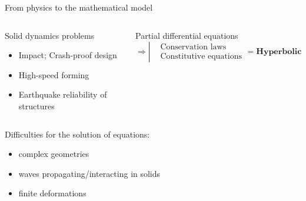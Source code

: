 \begin{frame}{From physics to the mathematical model}
\begin{overprint}
    \begin{columns}
      \begin{column}{0.45\textwidth}
        \begin{block}{Solid dynamics problems}
          \begin{itemize}
          \item[] Impact; Crash-proof design
          \item[] High-speed forming
          \item[] Earthquake reliability of structures 
          \end{itemize}
        \end{block}
      \end{column}
      
      \begin{column}{0.55\textwidth}
        \begin{block}{Partial differential equations}
          \begin{equation*}
            \Rightarrow \left\lvert
              \begin{aligned}
                & \text{Conservation laws} \\
                & \text{Constitutive equations} 
              \end{aligned}
            \right. = \textbf{Hyperbolic system}
          \end{equation*}
        \end{block}
      \end{column}
    \end{columns}
    
    \begin{block}{Difficulties for the solution of equations:}
      \begin{itemize}
      \item complex geometries
      \item waves propagating/interacting in solids
      \item finite deformations
      \end{itemize}
    \end{block}
    
  \end{overprint}
\end{frame}


